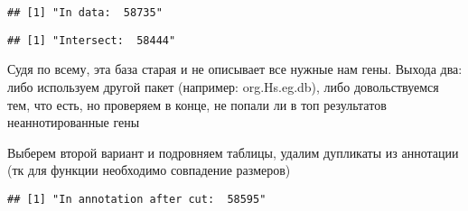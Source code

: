 \documentclass[
]{article}
\newenvironment{Shaded}{\begin{snugshade}}{\end{snugshade}}
\newcommand{\DataTypeTok}[1]{\textcolor[rgb]{0.13,0.29,0.53}{#1}}
\newcommand{\KeywordTok}[1]{\textcolor[rgb]{0.13,0.29,0.53}{\textbf{#1}}}
\newcommand{\NormalTok}[1]{#1}
\newcommand{\OperatorTok}[1]{\textcolor[rgb]{0.81,0.36,0.00}{\textbf{#1}}}
\newcommand{\OtherTok}[1]{\textcolor[rgb]{0.56,0.35,0.01}{#1}}
\newcommand{\StringTok}[1]{\textcolor[rgb]{0.31,0.60,0.02}{#1}}
\begin{document}
\begin{verbatim}
## [1] "In data:  58735"
\end{verbatim}

\begin{Shaded}
\end{Shaded}

\begin{verbatim}
## [1] "Intersect:  58444"
\end{verbatim}

Судя по всему, эта база старая и не описывает все нужные нам гены.
Выхода два: либо используем другой пакет (например: org.Hs.eg.db), либо
довольствуемся тем, что есть, но проверяем в конце, не попали ли в топ
результатов неаннотированные гены

Выберем второй вариант и подровняем таблицы, удалим дупликаты из
аннотации (тк для функции необходимо совпадение размеров)

\begin{Shaded}
\end{Shaded}

\begin{verbatim}
## [1] "In annotation after cut:  58595"
\end{verbatim}

\begin{Shaded}
\end{Shaded}
\end{document}
